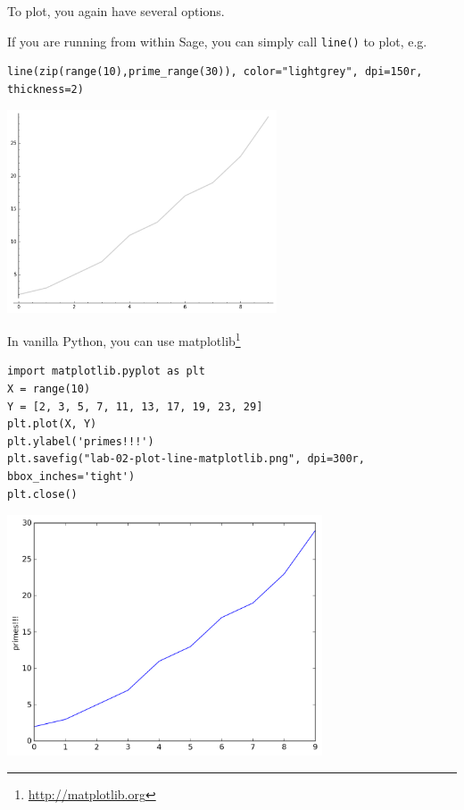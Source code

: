 \documentclass[10pt,a4paper,nobib]{tufte-handout}
\begin{document}
To plot, you again have several options.

If you are running from within Sage, you can simply call \texttt{line()} to plot, e.g. 

\lstset{language=sage,label= ,caption= ,captionpos=b,numbers=none}
\begin{lstlisting}
line(zip(range(10),prime_range(30)), color="lightgrey", dpi=150r, thickness=2)
\end{lstlisting}

\begin{center}
\includegraphics[width=0.6\textwidth]{lab-02-plot-line-sage.png}
\end{center}

In vanilla Python, you can use matplotlib\footnote{\url{http://matplotlib.org}}

\lstset{language=sage,label= ,caption= ,captionpos=b,numbers=none}
\begin{lstlisting}
import matplotlib.pyplot as plt
X = range(10)
Y = [2, 3, 5, 7, 11, 13, 17, 19, 23, 29]
plt.plot(X, Y)
plt.ylabel('primes!!!')
plt.savefig("lab-02-plot-line-matplotlib.png", dpi=300r, bbox_inches='tight')
plt.close()
\end{lstlisting}

\begin{center}
\includegraphics[width=0.7\textwidth]{./lab-02-plot-line-matplotlib.png}
\end{center} 
\end{document}
